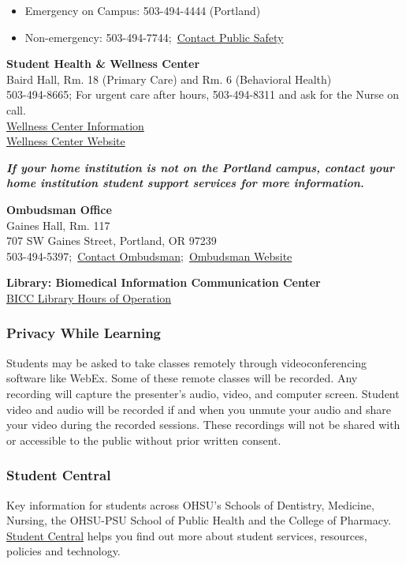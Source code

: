 \documentclass[
  letterpaper,
  DIV=11,
  numbers=noendperiod]{scrartcl}
\begin{document}
\begin{itemize}
\item
  Emergency on Campus: 503-494-4444 (Portland)
\item
  Non-emergency: 503-494-7744;~\href{mailto:pubsafe@ohsu.edu}{Contact
  Public Safety}
\end{itemize}

\textbf{Student Health \& Wellness Center}~\\
Baird Hall, Rm. 18 (Primary Care) and Rm. 6 (Behavioral Health)\\
503-494-8665; For urgent care after hours, 503-494-8311 and ask for the
Nurse on call.\\
\href{mailto:SHW@ohsu.edu}{Wellness Center Information}~~\\
\href{http://www.ohsu.edu/xd/education/student-services/joseph-trainer-health-wellness-center/}{Wellness
Center Website}

\textbf{\emph{If your home institution is not on the Portland campus,
contact your home institution student support services for more
information.}}

\textbf{Ombudsman Office}\\
Gaines Hall, Rm. 117\\
707 SW Gaines Street, Portland, OR 97239\\
503-494-5397;~\href{mailto:graybill@ohsu.edu}{Contact
Ombudsman};~\href{https://www.ohsu.edu/xd/about/services/ombudsman/}{Ombudsman
Website}

\textbf{Library: Biomedical Information Communication Center}\\
\href{http://www.ohsu.edu/xd/education/library/about/hours.cfm}{BICC
Library Hours of Operation}

\subsubsection{Privacy While Learning}\label{privacy-while-learning}

Students may be asked to take classes remotely through videoconferencing
software like WebEx. Some of these remote classes will be recorded. Any
recording will capture the presenter's audio, video, and computer
screen. Student video and audio will be recorded if and when you unmute
your audio and share your video during the recorded sessions. These
recordings will not be shared with or accessible to the public without
prior written consent.~

\subsubsection{Student Central}\label{student-central}

Key information for students across OHSU's Schools of Dentistry,
Medicine, Nursing, the OHSU-PSU School of Public Health and the College
of Pharmacy.
\href{https://o2.ohsu.edu/student-central/index.cfm}{Student Central}
helps you find out more about student services, resources, policies and
technology.
\end{document}
